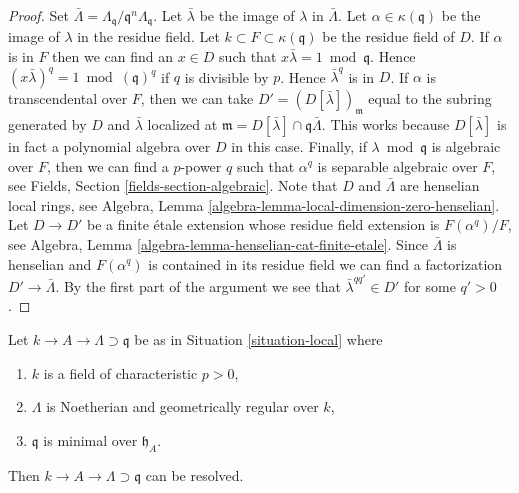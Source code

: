\begin{proof}
Set $\bar \Lambda = \Lambda_\mathfrak q/\mathfrak q^n\Lambda_\mathfrak q$.
Let $\bar \lambda$ be the image of $\lambda$ in $\bar \Lambda$.
Let $\alpha \in \kappa(\mathfrak q)$ be the image of $\lambda$ in the
residue field.
Let $k \subset F \subset \kappa(\mathfrak q)$ be the residue field of $D$.
If $\alpha$ is in $F$ then we can find an
$x \in D$ such that $x \bar\lambda = 1 \bmod \mathfrak q$. Hence
$(x \bar \lambda)^q = 1 \bmod (\mathfrak q)^q$ if $q$ is divisible by $p$.
Hence $\bar\lambda^q$ is in $D$. If $\alpha$ is
transcendental over $F$, then we can take $D' = (D[\bar \lambda])_\mathfrak m$
equal to the subring generated by $D$ and $\bar \lambda$ localized
at $\mathfrak m = D[\bar \lambda] \cap \mathfrak q \bar \Lambda$.
This works because $D[\bar \lambda]$ is in fact a polynomial algebra
over $D$ in this case. Finally, if $\lambda \bmod \mathfrak q$ is
algebraic over $F$, then we can find a $p$-power $q$ such that
$\alpha^q$ is separable algebraic over $F$, see
Fields, Section \ref{fields-section-algebraic}.
Note that $D$ and $\bar\Lambda$ are henselian local rings, see
Algebra, Lemma \ref{algebra-lemma-local-dimension-zero-henselian}.
Let $D \to D'$ be a finite \'etale extension
whose residue field extension is $F(\alpha^q)/F$, see
Algebra, Lemma \ref{algebra-lemma-henselian-cat-finite-etale}.
Since $\bar\Lambda$ is henselian and $F(\alpha^q)$ is contained
in its residue field we can find a factorization
$D' \to \bar \Lambda$. By the first part of the argument
we see that $\bar\lambda^{qq'} \in D'$ for some $q' > 0$.
\end{proof}

\begin{lemma}
\label{lemma-resolve-general}
Let $k \to A \to \Lambda \supset \mathfrak q$ be as in
Situation \ref{situation-local} where
\begin{enumerate}
\item $k$ is a field of characteristic $p > 0$,
\item $\Lambda$ is Noetherian and geometrically regular over $k$,
\item $\mathfrak q$ is minimal over $\mathfrak h_A$.
\end{enumerate}
Then $k \to A \to \Lambda \supset \mathfrak q$ can be resolved.
\end{lemma}

